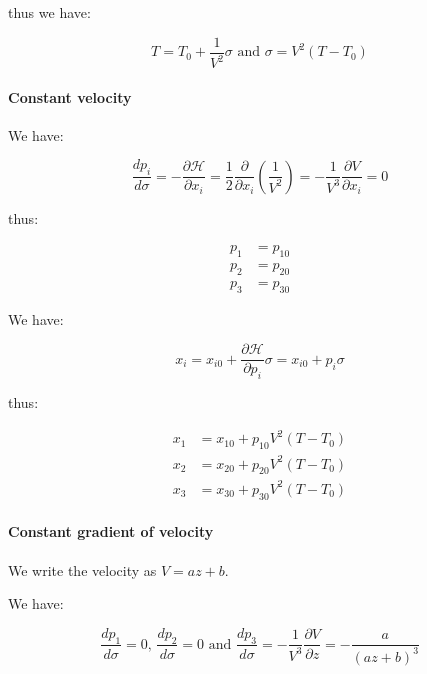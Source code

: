 \documentclass[main.tex]{subfiles}
\begin{document}
thus we have:

\begin{equation}
T = T_0 + \frac{1}{V^2} \sigma \text{ and } \sigma = V^2 (T - T_0)
\end{equation}

\paragraph{Constant velocity}

We have:

\begin{equation}
\frac{dp_i}{d\sigma} = - \frac{\partial \mathcal H}{\partial x_i} = \frac{1}{2} \frac{\partial}{\partial x_i} (\frac{1}{V^2}) = - \frac{1}{V^3} \frac{\partial V}{\partial x_i} = 0
\end{equation}

thus:

\begin{equation}
\begin{split}
p_1 & = p_{10} \\
p_2 & = p_{20} \\
p_3 & = p_{30}
\end{split}
\end{equation}

We have:

\begin{equation}
x_i = x_{i0} + \frac{\partial \mathcal H}{\partial p_i} \sigma = x_{i0} + p_i \sigma
\end{equation}

thus:

\begin{equation}
\begin{split}
x_1 & = x_{10} + p_{10} V^2 (T - T_0) \\
x_2 & = x_{20} + p_{20} V^2 (T - T_0) \\
x_3 & = x_{30} + p_{30} V^2 (T - T_0)
\end{split}
\end{equation}

\paragraph{Constant gradient of velocity}

We write the velocity as $V = a z + b$.

We have:

\begin{equation}
\frac{dp_1}{d\sigma} = 0 \text{, } \frac{dp_2}{d\sigma} = 0 \text{ and } \frac{dp_3}{d\sigma} = - \frac{1}{V^3} \frac{\partial V}{\partial z} = - \frac{a}{(a z + b)^3}
\end{equation}
\end{document}
